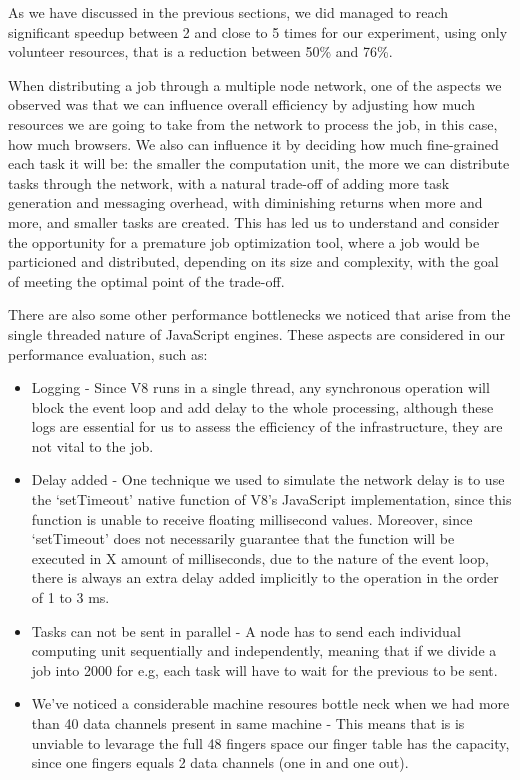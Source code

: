 As we have discussed in the previous sections, we did managed to reach significant speedup between 2 and close to 5 times for our experiment, using only volunteer resources, that is a reduction between 50\% and 76\%.

When distributing a job through a multiple node network, one of the aspects we observed was that we can influence overall efficiency by adjusting how much resources we are going to take from the network to process the job, in this case, how much browsers. We also can influence it by deciding how much fine-grained each task it will be: the smaller the computation unit, the more we can distribute tasks through the network, with a natural trade-off of adding more task generation and messaging overhead, with diminishing returns when more and more, and smaller tasks are created. This has led us to understand and consider the opportunity for a premature job optimization tool, where a job would be particioned and distributed, depending on its size and complexity, with the goal of meeting the optimal point of the trade-off.

There are also some other performance bottlenecks we noticed that arise from the single threaded nature of JavaScript engines. These aspects are considered in our performance evaluation, such as:

\begin{itemize}
  \item Logging - Since V8 runs in a single thread, any synchronous operation will block the event loop and add delay to the whole processing, although these logs are essential for us to assess the efficiency of the infrastructure, they are not vital to the job.
  \item Delay added - One technique we used to simulate the network delay is to use the `setTimeout' native function of V8's JavaScript implementation, since this function is unable to receive floating millisecond values. Moreover, since `setTimeout' does not necessarily guarantee that the function will be executed in X amount of milliseconds, due to the nature of the event loop, there is always an extra delay added implicitly to the operation in the order of 1 to 3 ms.
  \item Tasks can not be sent in parallel - A node has to send each individual computing unit sequentially and independently, meaning that if we divide a job into 2000 for e.g, each task will have to wait for the previous to be sent.
  \item We've noticed a considerable machine resoures bottle neck when we had more than 40 data channels present in same machine - This means that is is unviable to levarage the full 48 fingers space our finger table has the capacity, since one fingers equals 2 data channels (one in and one out).
\end{itemize}

